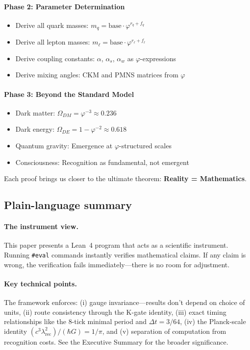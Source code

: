 \documentclass[11pt,a4paper,twoside]{article}
\numberwithin{equation}{section}
\theoremstyle{customthm}
\theoremstyle{customdef}
\theoremstyle{customrem}
\begin{document}
\paragraph{Phase 2: Parameter Determination}
\begin{itemize}[leftmargin=*,topsep=2pt,itemsep=2pt]
\item Derive all quark masses: $m_q = \text{base} \cdot \varphi^{r_q + f_q}$
\item Derive all lepton masses: $m_\ell = \text{base} \cdot \varphi^{r_\ell + f_\ell}$
\item Derive coupling constants: $\alpha$, $\alpha_s$, $\alpha_w$ as $\varphi$-expressions
\item Derive mixing angles: CKM and PMNS matrices from $\varphi$
\end{itemize}

\paragraph{Phase 3: Beyond the Standard Model}
\begin{itemize}[leftmargin=*,topsep=2pt,itemsep=2pt]
\item Dark matter: $\Omega_{DM} = \varphi^{-3} \approx 0.236$
\item Dark energy: $\Omega_{DE} = 1 - \varphi^{-2} \approx 0.618$
\item Quantum gravity: Emergence at $\varphi$-structured scales
\item Consciousness: Recognition as fundamental, not emergent
\end{itemize}

Each proof brings us closer to the ultimate theorem: \textbf{Reality = Mathematics}.

\subsection{Plain-language summary}\label{subsec:informal}

\paragraph{The instrument view.} This paper presents a Lean~4 program that acts as a scientific instrument. Running \texttt{\#eval} commands instantly verifies mathematical claims. If any claim is wrong, the verification fails immediately—there is no room for adjustment.

\paragraph{Key technical points.} The framework enforces: (i) gauge invariance—results don't depend on choice of units, (ii) route consistency through the K-gate identity, (iii) exact timing relationships like the 8-tick minimal period and $\Delta t = 3/64$, (iv) the Planck-scale identity $(c^3\lambda_{\mathrm{rec}}^2)/(\hbar G) = 1/\pi$, and (v) separation of computation from recognition costs. See the Executive Summary for the broader significance.
\end{document}
